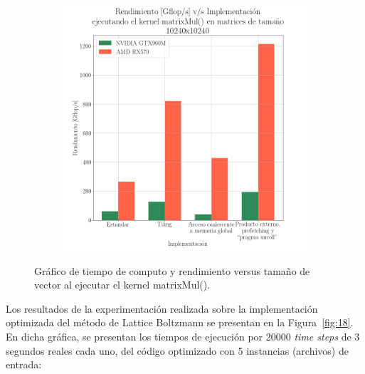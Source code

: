 \begin{figure}[H]
\begin{subfigure}{0.5\textwidth}
    \includegraphics[width=\linewidth]{Figures/plot3.png}
    \caption{} 
  \end{subfigure}%
  \caption{Gráfico de tiempo de computo y rendimiento versus tamaño de vector al ejecutar el kernel matrixMul().}
  \label{fig:17}
\end{figure}


\newpage

Los resultados de la experimentación realizada sobre la implementación optimizada del método de Lattice Boltzmann se presentan en la Figura~\ref{fig:18}.
En dicha gráfica, se presentan los tiempos de ejecución por 20000 \textit{time steps} de 3 segundos reales cada uno, del código optimizado con 5 instancias (archivos) de entrada:

